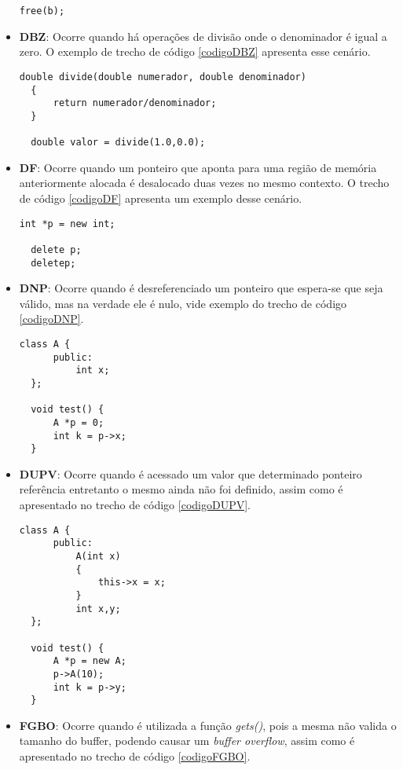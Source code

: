 \begin{itemize}
\begin{lstlisting}[caption={Código exemplo BF}, label=codigoBF]
  free(b);
    \end{lstlisting}
  \item \textbf{DBZ}: Ocorre quando há operações de divisão onde o denominador é igual a zero. O exemplo de trecho de código 
    \ref{codigoDBZ} apresenta esse cenário.

    \begin{lstlisting}[caption={Código exemplo DBZ}, label=codigoDBZ]
  double divide(double numerador, double denominador)
  {
      return numerador/denominador;
  }

  double valor = divide(1.0,0.0);
    \end{lstlisting}
  \item \textbf{DF}: Ocorre quando um ponteiro que aponta para uma região de memória anteriormente alocada é desalocado duas 
    vezes no mesmo contexto. O trecho de código \ref{codigoDF} apresenta um exemplo desse cenário.

    \begin{lstlisting}[caption={Código exemplo DF}, label=codigoDF]
  int *p = new int;

  delete p;
  deletep;
    \end{lstlisting}
  \item \textbf{DNP}: Ocorre quando é desreferenciado um ponteiro que espera-se que seja válido, mas na verdade ele é nulo, 
    vide exemplo do trecho de código \ref{codigoDNP}.

    \begin{lstlisting}[caption={Código exemplo DNP}, label=codigoDNP]
  class A {
      public:
          int x;
  };

  void test() {
      A *p = 0;
      int k = p->x;
  } 
    \end{lstlisting}
  \item \textbf{DUPV}: Ocorre quando é acessado um valor que determinado ponteiro referência entretanto o mesmo ainda não foi 
    definido, assim como é apresentado no trecho de código \ref{codigoDUPV}.

    \begin{lstlisting}[caption={Código exemplo DUPV}, label=codigoDUPV]
  class A {
      public:
          A(int x)
          {
              this->x = x;
          }
          int x,y;
  };

  void test() {
      A *p = new A;
      p->A(10);
      int k = p->y;
  } 
    \end{lstlisting}
  \item \textbf{FGBO}: Ocorre quando é utilizada a função \textit{gets()}, pois a mesma não valida o tamanho do buffer, podendo 
    causar um \textit{buffer overflow}, assim como é apresentado no trecho de código \ref{codigoFGBO}.


\end{itemize}
